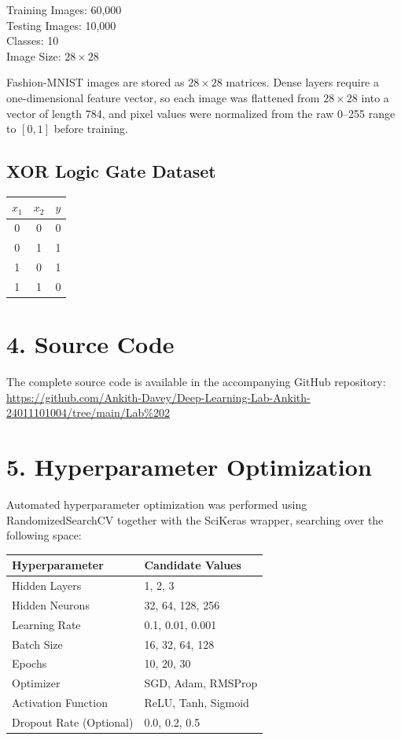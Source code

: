 \documentclass[11pt]{article}
\begin{document}
Training Images: 60,000 \\
Testing Images: 10,000 \\
Classes: 10 \\
Image Size: $28\times28$

Fashion-MNIST images are stored as $28\times28$ matrices. Dense layers require a one-dimensional feature vector, so each image was flattened from $28\times28$ into a vector of length 784, and pixel values were normalized from the raw 0--255 range to $[0,1]$ before training.

\subsection*{XOR Logic Gate Dataset}

\begin{center}
\begin{tabular}{|c|c|c|}
\hline
$x_1$ & $x_2$ & $y$\\
\hline
0 & 0 & 0\\
0 & 1 & 1\\
1 & 0 & 1\\
1 & 1 & 0\\
\hline
\end{tabular}
\end{center}

\section*{4. Source Code}

The complete source code is available in the accompanying GitHub repository:
\url{https://github.com/Ankith-Davey/Deep-Learning-Lab-Ankith-24011101004/tree/main/Lab%202}

\section*{5. Hyperparameter Optimization}

Automated hyperparameter optimization was performed using RandomizedSearchCV together with the SciKeras wrapper, searching over the following space:

\begin{center}
\begin{tabular}{|p{5cm}|p{7cm}|}
\hline
Hyperparameter & Candidate Values\\
\hline
Hidden Layers & 1, 2, 3\\
Hidden Neurons & 32, 64, 128, 256\\
Learning Rate & 0.1, 0.01, 0.001\\
Batch Size & 16, 32, 64, 128\\
Epochs & 10, 20, 30\\
Optimizer & SGD, Adam, RMSProp\\
Activation Function & ReLU, Tanh, Sigmoid\\
Dropout Rate (Optional) & 0.0, 0.2, 0.5\\
\hline
\end{tabular}
\end{center}
\end{document}
